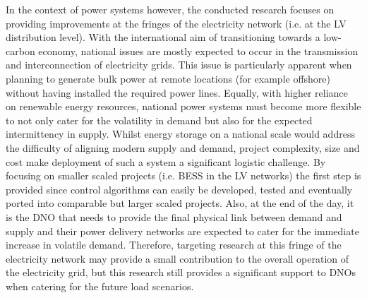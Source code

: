 In the context of power systems however, the conducted research focuses on providing improvements at the fringes of the electricity network (i.e. at the LV distribution level).
With the international aim of transitioning towards a low-carbon economy, national issues are mostly expected to occur in the transmission and interconnection of electricity grids.
This issue is particularly apparent when planning to generate bulk power at remote locations (for example offshore) without having installed the required power lines.
Equally, with higher reliance on renewable energy resources, national power systems must become more flexible to not only cater for the volatility in demand but also for the expected intermittency in supply.
Whilst energy storage on a national scale would address the difficulty of aligning modern supply and demand, project complexity, size and cost make deployment of such a system a significant logistic challenge.
By focusing on smaller scaled projects (i.e. BESS in the LV networks) the first step is provided since control algorithms can easily be developed, tested and eventually ported into comparable but larger scaled projects.
Also, at the end of the day, it is the DNO that needs to provide the final physical link between demand and supply and their power delivery networks are expected to cater for the immediate increase in volatile demand.
Therefore, targeting research at this fringe of the electricity network may provide a small contribution to the overall operation of the electricity grid, but this research still provides a significant support to DNOs when catering for the future load scenarios.
